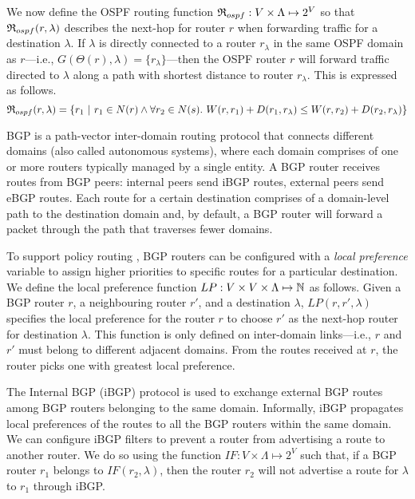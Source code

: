 We now define the OSPF routing function $\mathfrak{R}_{ospf}: 
V \times \Lambda \mapsto 2^V$ so that
$\mathfrak{R}_{ospf}(r,\lambda)$
 describes the next-hop for
router $r$ when forwarding traffic for a destination $\lambda$. 
If $\lambda$ is directly connected to a router $r_\lambda$ in the same OSPF domain as 
$r$---i.e., $G(\Theta(r),\lambda) = \{r_\lambda\}$---then 
the OSPF router $r$ will forward traffic directed to $\lambda$ along a path with
shortest distance to router $r_\lambda$. This is expressed as follows. 
\[
\mathfrak{R}_{ospf}(r,\lambda) = \{r_1 ~|~ r_1 \in N(r)\wedge \forall r_2 \in N(s) .~W(r, r_1) + D(r_1, r_\lambda) \le 
W(r, r_2) + D(r_2, r_\lambda)\}
\]


 BGP is a path-vector inter-domain routing protocol
that connects different domains (also called autonomous systems), where each domain
comprises of one or more routers typically managed by a single
entity. A BGP router receives routes from BGP peers: internal peers
send iBGP routes, external peers send eBGP routes. Each route for 
a certain
destination comprises of a domain-level path to the destination
domain and, by default, a BGP router will forward a packet through the path that traverses fewer domains.

 
To support policy routing  , BGP routers can be configured with a
\emph{local preference} variable to assign higher priorities to
specific routes for a particular destination. We define the local
preference function $LP: V \times V \times \Lambda \mapsto \mathbb{N}$ as
follows.  Given a BGP router $r$, a neighbouring router $r'$, and  
a destination $\lambda$, $LP(r, r', \lambda)$ specifies the local
preference for the router $r$ to choose $r'$ as the next-hop router for destination $\lambda$.  This function is only defined
on inter-domain links---i.e., $r$ and $r'$ must belong to different adjacent domains.  
From the routes received at $r$, the router
picks one with greatest local preference.

The Internal BGP (iBGP) protocol is used to 
exchange external BGP routes 
among BGP routers belonging
to the same domain. Informally, iBGP propagates local preferences of the routes to all the BGP routers within the same domain. 
We can configure iBGP 
filters to prevent a router from advertising 
a route to another router. We do so using the 
function $IF: V \times \Lambda \mapsto 2^V$
such that,
if a BGP router $r_1$ belongs to  $IF(r_2, \lambda)$, then
the router $r_2$ will not advertise a route for $\lambda$ to
$r_1$ through iBGP. 
 
